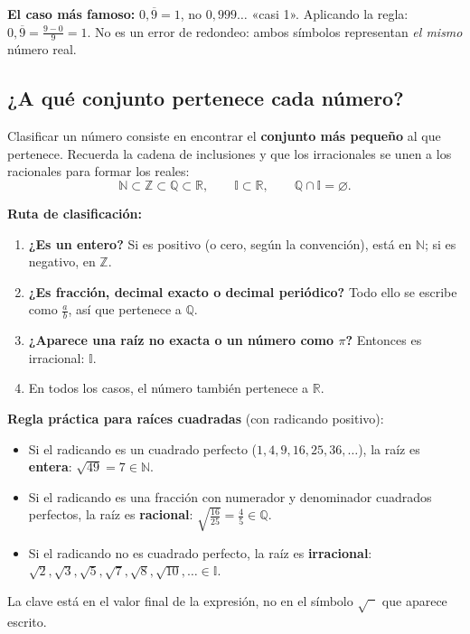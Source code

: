 \documentclass[12pt, letterpaper]{article}
\begin{document}
\begin{cuadroadvertencia}
  \textbf{El caso más famoso:} $0{,}\overline{9} = 1$, no $0{,}999\ldots$ «casi 1». Aplicando la regla: $0{,}\overline{9} = \frac{9-0}{9} = 1$. No es un error de redondeo: ambos símbolos representan \emph{el mismo} número real.
\end{cuadroadvertencia}

\subsection{¿A qué conjunto pertenece cada número?}

Clasificar un número consiste en encontrar el \textbf{conjunto más pequeño} al que pertenece. Recuerda la cadena de inclusiones y que los irracionales se unen a los racionales para formar los reales:
$$\mathbb{N} \subset \mathbb{Z} \subset \mathbb{Q} \subset \mathbb{R}, \qquad \mathbb{I} \subset \mathbb{R}, \qquad \mathbb{Q} \cap \mathbb{I} = \varnothing.$$

\noindent\textbf{Ruta de clasificación:}
\begin{enumerate}[leftmargin=*, label=\arabic*.]
  \item \textbf{¿Es un entero?} Si es positivo (o cero, según la convención), está en $\mathbb{N}$; si es negativo, en $\mathbb{Z}$.
  \item \textbf{¿Es fracción, decimal exacto o decimal periódico?} Todo ello se escribe como $\frac{a}{b}$, así que pertenece a $\mathbb{Q}$.
  \item \textbf{¿Aparece una raíz no exacta o un número como $\pi$?} Entonces es irracional: $\mathbb{I}$.
  \item En todos los casos, el número también pertenece a $\mathbb{R}$.
\end{enumerate}

\begin{cuadroteoria}
  \textbf{Regla práctica para raíces cuadradas} (con radicando positivo):
  \begin{itemize}[leftmargin=*]
    \item Si el radicando es un cuadrado perfecto ($1, 4, 9, 16, 25, 36, \ldots$), la raíz es \textbf{entera}: $\sqrt{49} = 7 \in \mathbb{N}$.
    \item Si el radicando es una fracción con numerador y denominador cuadrados perfectos, la raíz es \textbf{racional}: $\sqrt{\frac{16}{25}} = \frac{4}{5} \in \mathbb{Q}$.
    \item Si el radicando no es cuadrado perfecto, la raíz es \textbf{irracional}: $\sqrt{2}, \sqrt{3}, \sqrt{5}, \sqrt{7}, \sqrt{8}, \sqrt{10}, \ldots \in \mathbb{I}$.
  \end{itemize}
  La clave está en el valor final de la expresión, no en el símbolo $\sqrt{\phantom{x}}$ que aparece escrito.
\end{cuadroteoria}
\end{document}
